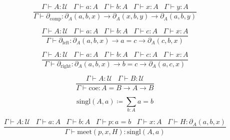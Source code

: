 \documentclass[a4paper,UKenglish,cleveref, autoref, thm-restate]{lipics-v2021}
\newcommand{\UU}{\ensuremath{\mathcal{U}}}
\begin{document}
\begin{equation*}
    \frac{\Gamma \vdash A : \UU \hspace{10pt} \Gamma \vdash a : A \hspace{10pt} \Gamma \vdash b : A \hspace{10pt} \Gamma \vdash x : A \hspace{10pt} \Gamma \vdash y : A}{\Gamma \vdash \partial_{\mathrm{comp}} : \partial_A(a, b, x) \rightarrow \partial_A(x, b, y) \rightarrow \partial_A(a, b, y)}
\end{equation*}

\begin{equation*}
    \frac{\Gamma \vdash A : \UU \hspace{10pt} \Gamma \vdash a : A \hspace{10pt} \Gamma \vdash b : A \hspace{10pt} \Gamma \vdash c : A \hspace{10pt} \Gamma \vdash x : A}{\Gamma \vdash \partial_{\mathrm{left}} : \partial_A(a, b, x) \rightarrow a = c \rightarrow \partial_A(c, b, x)}
\end{equation*}

\begin{equation*}
    \frac{\Gamma \vdash A : \UU \hspace{10pt} \Gamma \vdash a : A \hspace{10pt} \Gamma \vdash b : A \hspace{10pt} \Gamma \vdash c : A \hspace{10pt} \Gamma \vdash x : A}{\Gamma \vdash \partial_{\mathrm{right}} : \partial_A(a, b, x) \rightarrow b = c \rightarrow \partial_A(a, c, x)}
\end{equation*}

\begin{equation*}
    \frac{\Gamma \vdash A : \UU \hspace{10pt} \Gamma \vdash B : \UU}{\Gamma \vdash \mathrm{coe} : A = B \rightarrow A \rightarrow B}
\end{equation*}

\begin{equation*}
    \mathrm{singl}(A, a) \coloneqq \sum_{b : A} a = b
\end{equation*}

\begin{equation*}
    \frac{\Gamma \vdash A : \UU \hspace{10pt} \Gamma \vdash a : A \hspace{10pt} \Gamma \vdash b : A \hspace{10pt} \Gamma \vdash p : a = b \hspace{10pt} \Gamma \vdash x : A \hspace{10pt} \Gamma \vdash H : \partial_A(a, b, x)}{\Gamma \vdash \mathrm{meet}(p, x, H) : \mathrm{singl}(A, a)}
\end{equation*}
\end{document}
